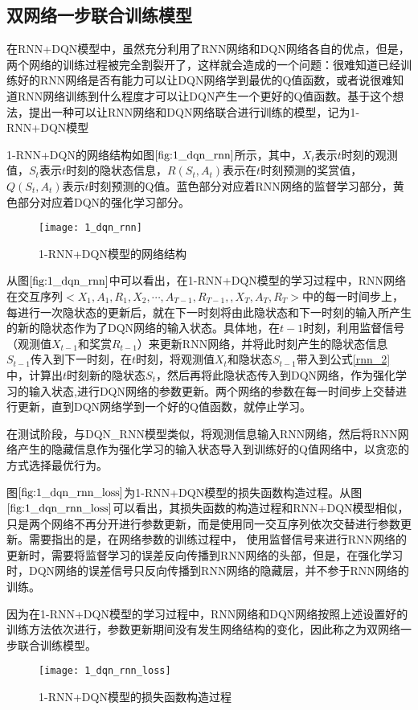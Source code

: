 \subsection{双网络一步联合训练模型}
在RNN+DQN模型中，虽然充分利用了RNN网络和DQN网络各自的优点，但是，两个网络的训练过程被完全割裂开了，这样就会造成的一个问题：很难知道已经训练好的RNN网络是否有能力可以让DQN网络学到最优的Q值函数，或者说很难知道RNN网络训练到什么程度才可以让DQN产生一个更好的Q值函数。基于这个想法，提出一种可以让RNN网络和DQN网络联合进行训练的模型，记为1-RNN+DQN模型

1-RNN+DQN的网络结构如图$\ref{fig:1_dqn_rnn}$所示，其中，$X_{t}$表示$t$时刻的观测值，$S_{t}$表示$t$时刻的隐状态信息，$R(S_{t},A_{t})$表示在$t$时刻预测的奖赏值，$Q(S_{t},A_{t})$表示$t$时刻预测的Q值。蓝色部分对应着RNN网络的监督学习部分，黄色部分对应着DQN的强化学习部分。
\begin{figure}[htbp]
\centering
\texttt{[image: 1\_dqn\_rnn]}
\caption{1-RNN+DQN模型的网络结构}
\label{fig:1_dqn_rnn}
\end{figure}

从图$\ref{fig:1_dqn_rnn}$中可以看出，在1-RNN+DQN模型的学习过程中，RNN网络在交互序列$<X_{1}, A_{1}, R_{1}, X_{2}, \cdots, A_{T-1}, R_{T-1}, ,X_{T}, A_{T}, R_{T}>$中的每一时间步上，每进行一次隐状态的更新后，就在下一时刻将由此隐状态和下一时刻的输入所产生的新的隐状态作为了DQN网络的输入状态。具体地，在$t-1$时刻，利用监督信号（观测值$X_{t-1}$和奖赏$R_{t-1}$）来更新RNN网络，并将此时刻产生的隐状态信息$S_{t-1}$传入到下一时刻，在$t$时刻，将观测值$X_{t}$和隐状态$S_{t-1}$带入到公式\eqref{rnn_2}中，计算出$t$时刻新的隐状态$S_{t}$，然后再将此隐状态传入到DQN网络，作为强化学习的输入状态,进行DQN网络的参数更新。两个网络的参数在每一时间步上交替进行更新，直到DQN网络学到一个好的Q值函数，就停止学习。

在测试阶段，与DQN\_RNN模型类似，将观测信息输入RNN网络，然后将RNN网络产生的隐藏信息作为强化学习的输入状态导入到训练好的Q值网络中，以贪恋的方式选择最优行为。


图$\ref{fig:1_dqn_rnn_loss}$为1-RNN+DQN模型的损失函数构造过程。从图$\ref{fig:1_dqn_rnn_loss}$可以看出，其损失函数的构造过程和RNN+DQN模型相似，只是两个网络不再分开进行参数更新，而是使用同一交互序列依次交替进行参数更新。需要指出的是，在网络参数的训练过程中，
使用监督信号来进行RNN网络的更新时，需要将监督学习的误差反向传播到RNN网络的头部，但是，在强化学习时，DQN网络的误差信号只反向传播到RNN网络的隐藏层，并不参于RNN网络的训练。

因为在1-RNN+DQN模型的学习过程中，RNN网络和DQN网络按照上述设置好的训练方法依次进行，参数更新期间没有发生网络结构的变化，因此称之为双网络一步联合训练模型。
\begin{figure}[htbp]
\centering
\texttt{[image: 1\_dqn\_rnn\_loss]}
\caption{1-RNN+DQN模型的损失函数构造过程}
\label{fig:1_dqn_rnn_loss}
\end{figure}

